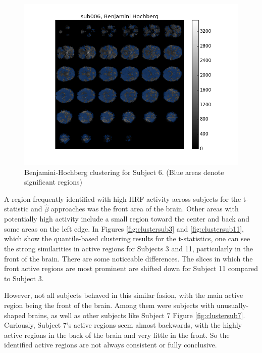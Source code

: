 \begin{figure}[ht]
\begin{minipage}[b]{0.45\linewidth}
	\centering
		\includegraphics[width=.8\linewidth]{../images/sub006_bh_overlay.png} 
	\caption{Benjamini-Hochberg clustering for Subject 6. 
	(Blue areas denote significant regions)}
	\label{fig:clusterBH}
\end{minipage}
\end{figure}

A region frequently identified with high HRF activity across subjects for the 
t-statistic and $\hat{\beta}$ approaches was the front area of the brain. 
Other areas with potentially high activity include a small region toward the 
center and back and some areas on the left edge. In Figures 
\ref{fig:clustersub3} and \ref{fig:clustersub11}, which show the 
quantile-based clustering results for the t-statistics, one can see the strong 
similarities in active regions for Subjects 3 and 11, particularly in the 
front of the brain. There are some noticeable differences. The slices in which 
the front active regions are most prominent are shifted down for Subject 11 
compared to Subject 3. 

However, not all subjects behaved in this similar fasion, with the main active 
region being the front of the brain. Among them were subjects with 
unusually-shaped brains, as well as other subjects like Subject 7 Figure 
\ref{fig:clustersub7}. Curiously, Subject 7's active regions seem almost 
backwards, with the highly active regions in the back of the brain and very 
little in the front. So the identified active regions are not always 
consistent or fully conclusive. 

